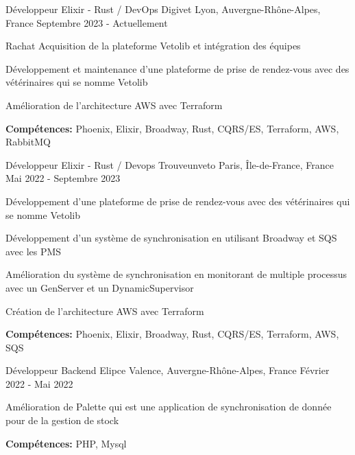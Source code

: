 
\begin{cventries}
  \cventry
    {Développeur Elixir - Rust / DevOps}
    {Digivet}
    {Lyon, Auvergne-Rhône-Alpes, France}
    {Septembre 2023 - Actuellement}
    {
      \begin{cvitems}
        \item {Rachat Acquisition de la plateforme Vetolib et intégration des équipes}
        \item {Développement et maintenance d'une plateforme de prise de rendez-vous avec des vétérinaires qui se nomme Vetolib}
        \item {Amélioration de l'architecture AWS avec Terraform}
        \item {\textbf{Compétences:} Phoenix, Elixir, Broadway, Rust, CQRS/ES, Terraform, AWS, RabbitMQ}
      \end{cvitems}
    }

  \cventry
    {Développeur Elixir - Rust / Devops}
    {Trouveunveto}
    {Paris, Île-de-France, France}
    {Mai 2022 - Septembre 2023}
    {
      \begin{cvitems}
        \item {Développement d'une plateforme de prise de rendez-vous avec des vétérinaires qui se nomme Vetolib}
        \item {Développement d'un système de synchronisation en utilisant Broadway et SQS avec les PMS}
        \item {Amélioration du système de synchronisation en monitorant de multiple processus avec un GenServer et un DynamicSupervisor}
        \item {Création de l'architecture AWS avec Terraform}
        \item {\textbf{Compétences:} Phoenix, Elixir, Broadway, Rust, CQRS/ES, Terraform, AWS, SQS}
      \end{cvitems}
    }

  \cventry
    {Développeur Backend}
    {Elipce}
    {Valence, Auvergne-Rhône-Alpes, France}
    {Février 2022 - Mai 2022}
    {
      \begin{cvitems}
        \item {Amélioration de Palette qui est une application de synchronisation de donnée pour de la gestion de stock}
        \item {\textbf{Compétences:} PHP, Mysql}
      \end{cvitems}
    }


\end{cventries}
